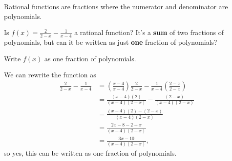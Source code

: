 \documentclass[noauthor]{ximera}
\begin{document}
\begin{problem}
Rational functions are fractions where the numerator and
denominator are polynomials.

Is \(f(x) = \frac{2}{2 - x} - \frac{1}{x - 4}\) a rational function?
It's a \textbf{sum} of two fractions of polynomials, but can it be
written as just \textbf{one} fraction of polynomials?

Write \(f(x)\) as one fraction of polynomials.

\begin{explanation}
We can rewrite the function as 
\begin{align*}
    \frac{2}{2 - x} - \frac{1}{x - 4} & = \left(\frac{x - 4}{x - 4}\right) \frac{2}{2 - x} - \frac{1}{x - 4} \left(\frac{2 - x}{2 - x}\right) \\
    & = \frac{(x - 4)(2)}{(x - 4)(2 - x)} - \frac{(2 - x)}{(x - 4)(2 - x)} \\
    & = \frac{(x - 4)(2) - (2 - x)}{(x - 4)(2 - x)}  \\
    & = \frac{2x - 8 - 2 + x}{(x - 4)(2 - x)} \\
    & = \frac{3x - 10}{(x - 4)(2 - x)},
\end{align*}
so yes, this can be written as one fraction of polynomials.
\end{explanation}
\end{problem}
\end{document}
